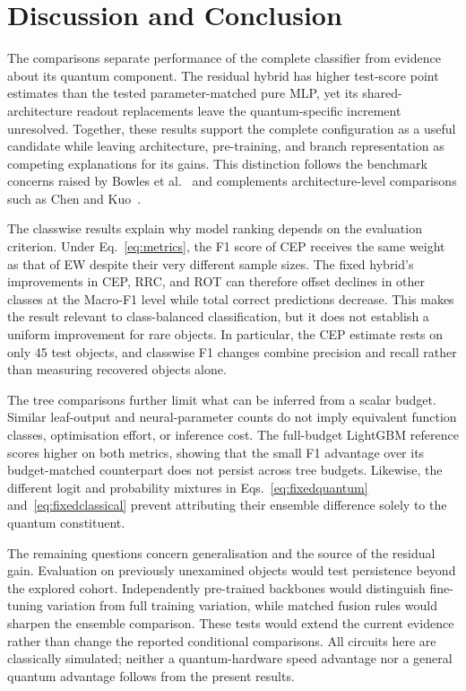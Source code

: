 \documentclass[aps,a4paper,onecolumn,11pt,unpublished]{quantumarticle}
\begin{document}
\FloatBarrier
\section{Discussion and Conclusion}

The comparisons separate performance of the complete classifier from evidence about its quantum component. The residual hybrid has higher test-score point estimates than the tested parameter-matched pure MLP, yet its shared-architecture readout replacements leave the quantum-specific increment unresolved. Together, these results support the complete configuration as a useful candidate while leaving architecture, pre-training, and branch representation as competing explanations for its gains. This distinction follows the benchmark concerns raised by Bowles et al.~\cite{bowles2024} and complements architecture-level comparisons such as Chen and Kuo~\cite{chenkuo2026}.

The classwise results explain why model ranking depends on the evaluation criterion. Under Eq.~\eqref{eq:metrics}, the F1 score of CEP receives the same weight as that of EW despite their very different sample sizes. The fixed hybrid's improvements in CEP, RRC, and ROT can therefore offset declines in other classes at the Macro-F1 level while total correct predictions decrease. This makes the result relevant to class-balanced classification, but it does not establish a uniform improvement for rare objects. In particular, the CEP estimate rests on only 45 test objects, and classwise F1 changes combine precision and recall rather than measuring recovered objects alone.

The tree comparisons further limit what can be inferred from a scalar budget. Similar leaf-output and neural-parameter counts do not imply equivalent function classes, optimisation effort, or inference cost. The full-budget LightGBM reference scores higher on both metrics, showing that the small F1 advantage over its budget-matched counterpart does not persist across tree budgets. Likewise, the different logit and probability mixtures in Eqs.~\eqref{eq:fixedquantum} and~\eqref{eq:fixedclassical} prevent attributing their ensemble difference solely to the quantum constituent.

The remaining questions concern generalisation and the source of the residual gain. Evaluation on previously unexamined objects would test persistence beyond the explored cohort. Independently pre-trained backbones would distinguish fine-tuning variation from full training variation, while matched fusion rules would sharpen the ensemble comparison. These tests would extend the current evidence rather than change the reported conditional comparisons. All circuits here are classically simulated; neither a quantum-hardware speed advantage nor a general quantum advantage follows from the present results.
\end{document}

